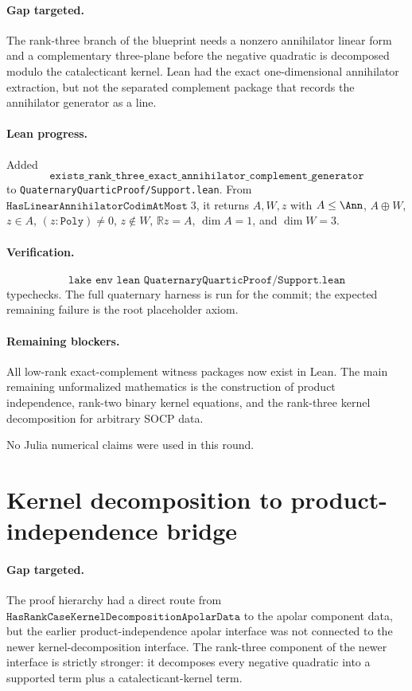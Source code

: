 \documentclass[11pt]{article}
\begin{document}
\paragraph{Gap targeted.}
The rank-three branch of the blueprint needs a nonzero annihilator linear form
and a complementary three-plane before the negative quadratic is decomposed
modulo the catalecticant kernel.  Lean had the exact one-dimensional
annihilator extraction, but not the separated complement package that records
the annihilator generator as a line.

\paragraph{Lean progress.}
Added
\[
\texttt{exists\_rank\_three\_exact\_annihilator\_complement\_generator}
\]
to \texttt{QuaternaryQuarticProof/Support.lean}.  From
\(\texttt{HasLinearAnnihilatorCodimAtMost}\;3\), it returns
\(A,W,z\) with \(A\le\Ann\), \(A\oplus W\), \(z\in A\),
\((z:\texttt{Poly})\ne0\), \(z\notin W\), \(\mathbb Rz=A\),
\(\dim A=1\), and \(\dim W=3\).

\paragraph{Verification.}
\[
\texttt{lake env lean QuaternaryQuarticProof/Support.lean}
\]
typechecks.  The full quaternary harness is run for the commit; the expected
remaining failure is the root placeholder axiom.

\paragraph{Remaining blockers.}
All low-rank exact-complement witness packages now exist in Lean.  The main
remaining unformalized mathematics is the construction of product independence,
rank-two binary kernel equations, and the rank-three kernel decomposition for
arbitrary SOCP data.

No Julia numerical claims were used in this round.

\section*{Kernel decomposition to product-independence bridge}

\paragraph{Gap targeted.}
The proof hierarchy had a direct route from
\(\texttt{HasRankCaseKernelDecompositionApolarData}\) to the apolar component
data, but the earlier product-independence apolar interface was not connected
to the newer kernel-decomposition interface.  The rank-three component of the
newer interface is strictly stronger: it decomposes every negative quadratic
into a supported term plus a catalecticant-kernel term.
\end{document}
